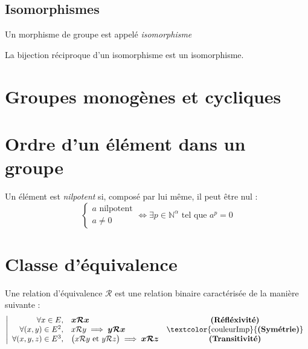 \documentclass[11pt,a4paper,fleqn,pdftex]{report}
\begin{document}
\subsection{Isomorphismes} %
\label{sub:isomorphismes}
\begin{dfn}[Isomorphisme]
     Un morphisme de groupe  est appelé \emph{isomorphisme}
\end{dfn}
\begin{theorem}
     La bijection réciproque d'un isomorphisme est un isomorphisme.
\end{theorem}
\section{Groupes monogènes et cycliques} %
\label{sec:groupes_monogenes_et_cycliques}

\section{Ordre d'un élément dans un groupe} %
\label{sec:ordre_d_un_element_dans_un_groupe}
\begin{dfn}
Un élément est \emph{nilpotent} si, composé par lui même, il peut être nul : 
\begin{equation}
\left\lbrace \begin{array}{l} a\text{ nilpotent}\\ a\neq 0 \end{array}\right. \Leftrightarrow \exists p \in \mathbb{N}^{\alpha} \text{ tel que } a^p =0 
\end{equation}
\end{dfn}
\section{Classe d'équivalence}
\begin{dfn}
Une relation d'équivalence $\mathcal{R}$ est une relation binaire caractérisée de la manière suivante : 
\begin{equation}
\left|
\begin{array}{r l c}
\forall x \in E,& \boldsymbol{x\mathcal{R}x} & \text{\textbf{(Réfléxivité)}}\\
\forall (x,y) \in E^2, & x\mathcal{R}y\implies \boldsymbol{y\mathcal{R}x} &\text{\textcolor{couleurImp}{\textbf{(Symétrie)}}}\\
\forall (x,y,z) \in E^3, & \big( x\mathcal{R}y \text{ et } y\mathcal{R}z \big) \implies \boldsymbol{x\mathcal{R}z} & \text{\textbf{(Transitivité)}}
\end{array}
\right.
\end{equation}
\end{dfn}
\end{document}
